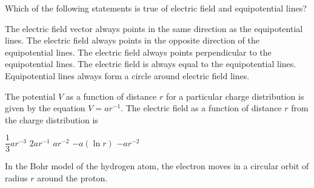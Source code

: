\documentclass{../../oss-classkick-exam}
\begin{document}
\begin{questions}
\begin{multicols*}{2}
    \question Which of the following statements is true of electric field and
    equipotential lines?
    \begin{choices}
      \choice The electric field vector always points in the same direction as
      the equipotential lines.
      \choice The electric field always points in the opposite direction of the
      equipotential lines.
      \choice The electric field always points perpendicular to the
      equipotential lines.
      \choice The electric field is always equal to the equipotential lines.
      \choice Equipotential lines always form a circle around electric field
      lines.
    \end{choices}
    \vspace{.7in}
   
    \question The potential $V$ as a function of distance $r$ for a particular
    charge distribution is given by the equation $V=ar^{-1}$. The electric field
    as a function of distance $r$ from the charge distribution is
    \begin{choices}
      \choice $\dfrac13ar^{-3}$
      \choice $2ar^{-1}$
      \choice $ar^{-2}$
      \choice $-a(\ln r)$
      \choice $-ar^{-2}$
    \end{choices}
  \end{multicols*}
  \newpage


  \question In the Bohr model of the hydrogen atom, the electron moves in a
  circular orbit of radius $r$ around the proton.
  \newpage



\end{questions}
\end{document}
